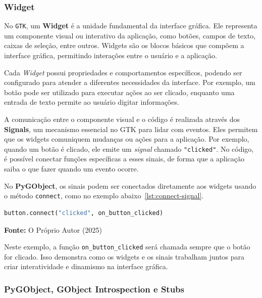 \subsubsection{Widget}

No \texttt{GTK}, um \textbf{Widget} é a unidade fundamental da interface gráfica. Ele representa um componente visual ou interativo da aplicação, como botões, campos de texto, caixas de seleção, entre outros. Widgets são os blocos básicos que compõem a interface gráfica, permitindo interações entre o usuário e a aplicação.

Cada \textit{Widget} possui propriedades e comportamentos específicos, podendo ser configurado para atender a diferentes necessidades da interface. Por exemplo, um botão pode ser utilizado para executar ações ao ser clicado, enquanto uma entrada de texto permite ao usuário digitar informações.

A comunicação entre o componente visual e o código é realizada através dos \textbf{Signals}, um mecanismo essencial no GTK para lidar com eventos. Eles permitem que os widgets comuniquem mudanças ou ações para a aplicação. Por exemplo, quando um botão é clicado, ele emite um \textit{signal} chamado \texttt{"clicked"}. No código, é possível conectar funções específicas a esses sinais, de forma que a aplicação saiba o que fazer quando um evento ocorre.

No \textbf{PyGObject}, os sinais podem ser conectados diretamente aos widgets usando o método \texttt{connect}, como no exemplo abaixo~\ref{lst:connect-signal}.

\begin{center}
    \begin{lstlisting}[language=Python, caption=Exemplo de conexão de um sinal a um botão no GTK., label=lst:connect-signal]
        button.connect("clicked", on_button_clicked)
    \end{lstlisting}
    \centerline{\textbf{Fonte:} O Próprio Autor (2025)}
\end{center}

Neste exemplo, a função \texttt{on\_button\_clicked} será chamada sempre que o botão for clicado. Isso demonstra como os widgets e os sinais trabalham juntos para criar interatividade e dinamismo na interface gráfica.

\subsubsection{PyGObject, GObject Introspection e Stubs}

